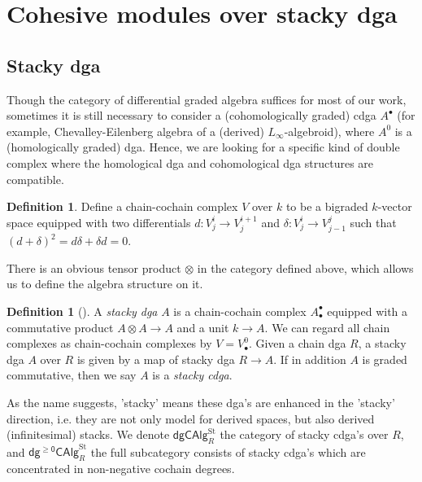 \documentclass[12pt]{amsart}
\theoremstyle{definition}
\newtheorem{defn}[thm]{Definition}
\theoremstyle{remark}
\numberwithin{equation}{section}
\newcommand{\1}{{\mathbb{1}}}
\newcommand{\dgcalg}{\mathsf{dgCAlg}}
\newcommand{\dcalg}{\mathsf{dg^{\ge 0}CAlg}}
\newcommand{\st}{{\operatorname{St}}}
\begin{document}
\section{Cohesive modules over stacky dga}
\subsection{Stacky dga}

Though the category of differential graded algebra suffices for most of our work, sometimes it is still necessary to consider a (cohomologically graded) cdga $A^{\bullet}$ (for example, Chevalley-Eilenberg algebra of a (derived) $L_{\infty}$-algebroid), where $A^0$ is a (homologically graded) dga. Hence, we are looking for a specific kind of double complex where the homological dga and cohomological dga structures are compatible. 
\begin{defn}
Define a chain-cochain complex $V$ over $k$ to be a bigraded $k$-vector space equipped with two differentials $d: V^i_j \to V_j^{i+1}$ and $\delta: V^i_j \to V_{j-1}^j$ such that $(d+\delta)^2 = d \delta + \delta d = 0.$
\end{defn}
There is an obvious tensor product $\otimes$ in the category defined above, which allows us to define the algebra structure on it.
\begin{defn}[\cite{Pri17}]
    A {\it stacky dga} $A$ is a chain-cochain complex $A^{\bullet}_{\bullet}$ equipped with a commutative product $A\otimes A \to A$ and a unit $k \to A$. We can regard all chain complexes as chain-cochain complexes by $V = V^0_{\bullet}$. Given a chain dga $R$, a stacky dga $A$ over $R$ is given by a map of stacky dga $R \to A$. If in addition  $A$ is graded commutative, then we say $A$ is a {\it stacky cdga}.
    
    
    As the name suggests, 'stacky' means these dga's are enhanced in the 'stacky' direction, i.e. they are not only model for derived spaces, but also  derived (infinitesimal) stacks. We denote $\dgcalg_R^{\st}$ the category of stacky cdga's over $R$, and $\dcalg_R^{\st}$ the full subcategory consists of stacky cdga's which are concentrated in non-negative cochain degrees.
\end{defn}
\end{document}
